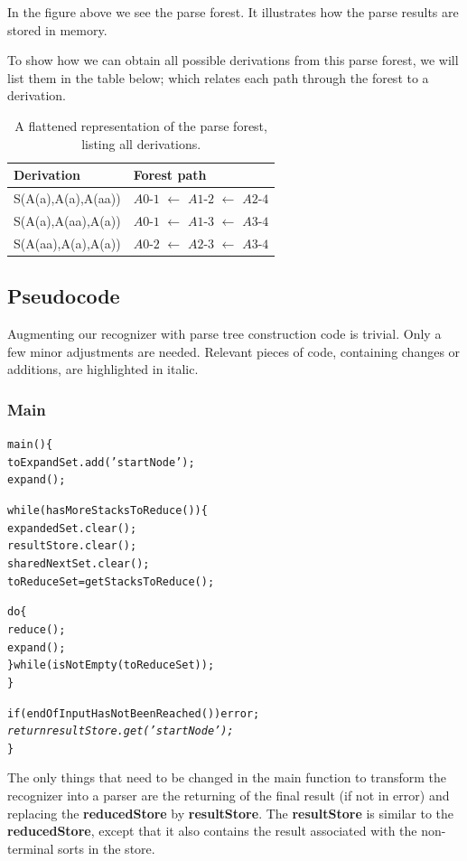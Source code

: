 \documentclass[a4paper,10pt]{article}
\begin{document}
In the figure above we see the parse forest. It illustrates how the parse results are stored in memory.

To show how we can obtain all possible derivations from this parse forest, we will list them in the table below; which relates each path through the forest to a derivation.

\begin{table}[H]
\centering
\begin{tabular}{ p{15em} p{15em} }
Derivation & Forest path\\
\hline
S(A(a),A(a),A(aa)) & $A0$-$1$ $\leftarrow$ $A1$-$2$ $\leftarrow$ $A2$-$4$\\
S(A(a),A(aa),A(a)) & $A0$-$1$ $\leftarrow$ $A1$-$3$ $\leftarrow$ $A3$-$4$\\
S(A(aa),A(a),A(a)) & $A0$-$2$ $\leftarrow$ $A2$-$3$ $\leftarrow$ $A3$-$4$
\end{tabular}
\caption{A flattened representation of the parse forest, listing all derivations.}
\end{table}

\pagebreak
\subsection{Pseudocode}

Augmenting our recognizer with parse tree construction code is trivial. Only a few minor adjustments are needed. Relevant pieces of code, containing changes or additions, are highlighted in italic.

\subsubsection{Main}
{\small
\begin{alltt}
main()\{
  toExpandSet.add('startNode');
  expand();
  
  while(hasMoreStacksToReduce())\{
    expandedSet.clear();
    resultStore.clear();
    sharedNextSet.clear();
    toReduceSet = getStacksToReduce();
    
    do\{
       reduce();
       expand();
    \}while(isNotEmpty(toReduceSet));
  \}
  
  if(endOfInputHasNotBeenReached()) error;
  \textit{
  return resultStore.get('startNode');}
\}
\end{alltt}
}

The only things that need to be changed in the main function to transform the recognizer into a parser are the returning of the final result (if not in error) and replacing the {\bf reducedStore} by {\bf resultStore}. The {\bf resultStore} is similar to the {\bf reducedStore}, except that it also contains the result associated with the non-terminal sorts in the store.
\end{document}

